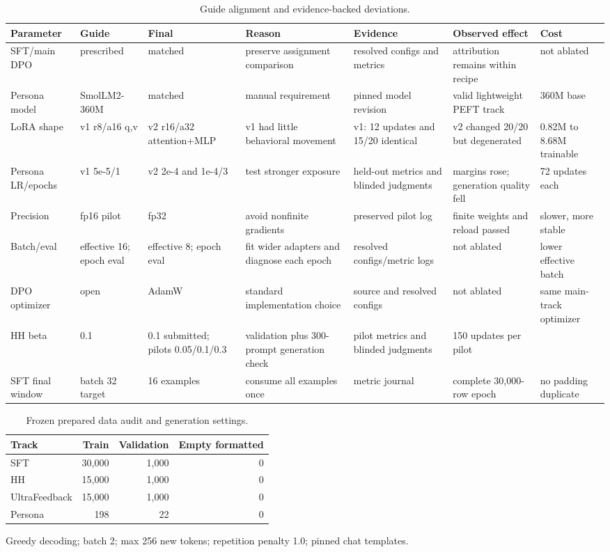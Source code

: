 \begin{table}[t]\centering\scriptsize\caption{Guide alignment and evidence-backed deviations.}
\setlength{\tabcolsep}{2pt}\begin{tabularx}{\textwidth}{p{1.6cm}p{1.3cm}p{1.8cm}XXXp{1.5cm}}\toprule Parameter & Guide & Final & Reason & Evidence & Observed effect & Cost\\\midrule
SFT/main DPO & prescribed & matched & preserve assignment comparison & resolved configs and metrics & attribution remains within recipe & not ablated\\
Persona model & SmolLM2-360M & matched & manual requirement & pinned model revision & valid lightweight PEFT track & 360M base\\
LoRA shape & v1 r8/a16 q,v & v2 r16/a32 attention+MLP & v1 had little behavioral movement & v1: 12 updates and 15/20 identical & v2 changed 20/20 but degenerated & 0.82M to 8.68M trainable\\
Persona LR/epochs & v1 5e-5/1 & v2 2e-4 and 1e-4/3 & test stronger exposure & held-out metrics and blinded judgments & margins rose; generation quality fell & 72 updates each\\
Precision & fp16 pilot & fp32 & avoid nonfinite gradients & preserved pilot log & finite weights and reload passed & slower, more stable\\
Batch/eval & effective 16; epoch eval & effective 8; epoch eval & fit wider adapters and diagnose each epoch & resolved configs/metric logs & not ablated & lower effective batch\\
DPO optimizer & open & AdamW & standard implementation choice & source and resolved configs & not ablated & same main-track optimizer\\
HH beta & 0.1 & 0.1 submitted; pilots 0.05/0.1/0.3 & validation plus 300-prompt generation check & pilot metrics and blinded judgments & 150 updates per pilot\\
SFT final window & batch 32 target & 16 examples & consume all examples once & metric journal & complete 30,000-row epoch & no padding duplicate\\
\bottomrule\end{tabularx}\end{table}
\begin{table}[t]\centering\footnotesize\caption{Frozen prepared data audit and generation settings.}
\begin{tabular}{lrrr}\toprule Track & Train & Validation & Empty formatted\\\midrule
SFT & 30,000 & 1,000 & 0\\
HH & 15,000 & 1,000 & 0\\
UltraFeedback & 15,000 & 1,000 & 0\\
Persona & 198 & 22 & 0\\
\bottomrule\end{tabular}\par\vspace{2pt}\scriptsize Greedy decoding; batch 2; max 256 new tokens; repetition penalty 1.0; pinned chat templates.\end{table}
